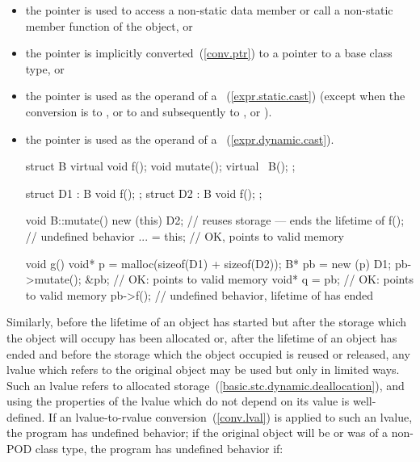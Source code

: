 \begin{itemize}
\item the pointer is used to access a non-static data member or call a
non-static member function of the object, or

\item the pointer is implicitly converted~(\ref{conv.ptr}) to a pointer
to a base class type, or

\item the pointer is used as the operand of a
~(\ref{expr.static.cast}) (except when the conversion
is to , or to  and subsequently to
, or  ).

\item the pointer is used as the operand of a
~(\ref{expr.dynamic.cast}). \enterexample

\begin{codeblock}
struct B {
	virtual void f();
	void mutate();
	virtual ~B();
};

struct D1 : B { void f(); };
struct D2 : B { void f(); };

void B::mutate() {
	new (this) D2;		// reuses storage --- ends the lifetime of 
	f();			// undefined behavior
	... = this;		// OK,  points to valid memory
}

void g() {
	void* p = malloc(sizeof(D1) + sizeof(D2));
	B* pb = new (p) D1;
	pb->mutate();
	&pb;			// OK:  points to valid memory
	void* q = pb;		// OK:  points to valid memory
	pb->f();		// undefined behavior, lifetime of  has ended
}
\end{codeblock}
\exitexampleb
\end{itemize}

\pnum
Similarly, before the lifetime of an object has started but after the
storage which the object will occupy has been allocated or, after the
lifetime of an object has ended and before the storage which the object
occupied is reused or released, any lvalue which refers to the original
object may be used but only in limited ways. Such an lvalue refers to
allocated storage~(\ref{basic.stc.dynamic.deallocation}), and using the
properties of the lvalue which do not depend on its value is
well-defined. If an lvalue-to-rvalue conversion~(\ref{conv.lval}) is
applied to such an lvalue, the program has undefined behavior; if the
original object will be or was of a non-POD class type, the program
has undefined behavior if:

